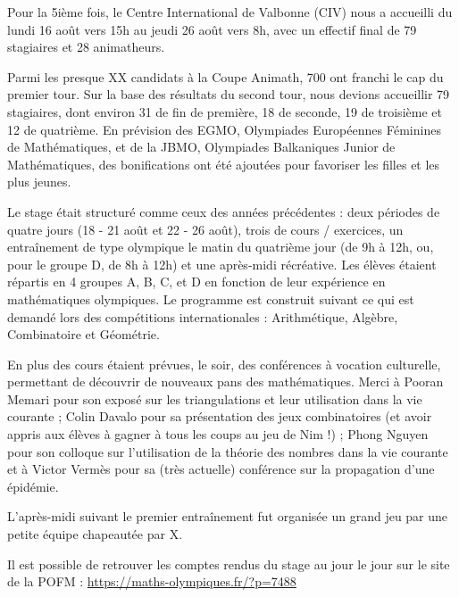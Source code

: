 
Pour la 5ième fois, le Centre International de Valbonne (CIV) nous a accueilli du lundi 16 août vers 15h au jeudi 26 août vers 8h, avec un effectif final de 79 stagiaires et 28 animatheurs. 

Parmi les presque XX candidats à la Coupe Animath, 700 ont franchi le cap du premier tour. Sur la base des résultats du second tour, nous devions accueillir 79 stagiaires, dont environ 31 de fin de première, 18 de seconde, 19 de troisième et 12 de quatrième. En prévision des EGMO, Olympiades Européennes Féminines de Mathématiques, et de la JBMO, Olympiades Balkaniques Junior de Mathématiques, des bonifications ont été ajoutées pour favoriser les filles et les plus jeunes.




Le stage était structuré comme ceux des années précédentes : deux périodes de quatre jours (18 - 21 août et 22 - 26 août), trois de cours / exercices, un entraînement %
de type olympique le matin du quatrième jour (de 9h à 12h, ou, pour le groupe D, de 8h à 12h) et une après-midi récréative. Les élèves étaient répartis en 4 groupes A, B, C, et D en fonction de leur expérience en mathématiques olympiques.
Le programme est construit suivant ce qui est demandé lors des compétitions internationales : Arithmétique, Algèbre, Combinatoire et Géométrie.



En plus des cours étaient prévues, le soir, des conférences à vocation culturelle, permettant de découvrir de nouveaux pans des mathématiques. Merci à Pooran Memari pour son exposé sur les triangulations et leur utilisation dans la vie courante ; Colin Davalo pour sa présentation des jeux combinatoires (et avoir appris aux élèves à gagner à tous les coups au jeu de Nim !) ; Phong Nguyen pour son colloque sur l'utilisation de la théorie des nombres dans la vie courante et à Victor Vermès pour sa (très actuelle) conférence sur la propagation d'une épidémie.



L'après-midi suivant le premier entraînement fut organisée un grand jeu par une petite équipe chapeautée par X. %


Il est possible de retrouver les comptes rendus du stage au jour le jour sur le site de la POFM : \url{https://maths-olympiques.fr/?p=7488}

\vfill
\pagebreak
